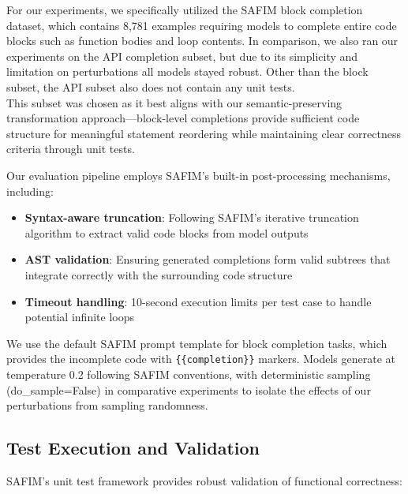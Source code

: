 \documentclass[%
thesis=student,%
coverpage=false,%
titlepage=false,%
headmarks=true, %
english,%
font=libertine, %
math=newpxtx, %
BCOR=5mm,%
coverBCOR=11mm%
]{tum-templates/book/tumbook}
\begin{document}
For our experiments, we specifically utilized the SAFIM block completion dataset, which contains 8,781 examples requiring models to complete entire code blocks such as function bodies and loop contents. In comparison, we also ran our experiments on the API completion subset, but due to its simplicity and limitation on perturbations all models stayed robust. Other than the block subset, the API subset also does not contain any unit tests. \\
This subset was chosen as it best aligns with our semantic-preserving transformation approach—block-level completions provide sufficient code structure for meaningful statement reordering while maintaining clear correctness criteria through unit tests.

Our evaluation pipeline employs SAFIM's built-in post-processing mechanisms, including:
\begin{itemize}
    \item \textbf{Syntax-aware truncation}: Following SAFIM's iterative truncation algorithm to extract valid code blocks from model outputs
    \item \textbf{AST validation}: Ensuring generated completions form valid subtrees that integrate correctly with the surrounding code structure  
    \item \textbf{Timeout handling}: 10-second execution limits per test case to handle potential infinite loops
\end{itemize}

We use the default SAFIM prompt template for block completion tasks, which provides the incomplete code with \texttt{\{\{completion\}\}} markers. Models generate at temperature 0.2 following SAFIM conventions, with deterministic sampling (do\_sample=False) in comparative experiments to isolate the effects of our perturbations from sampling randomness.

\subsection{Test Execution and Validation}

SAFIM's unit test framework provides robust validation of functional correctness:
\newpage
\end{document}
